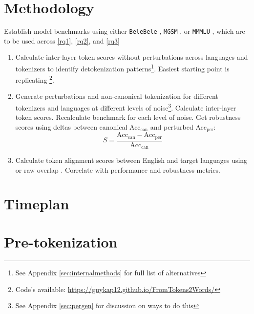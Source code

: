 \documentclass[a4paper]{article}
\begin{document}
\section{Methodology}

Establish model benchmarks using either \texttt{BeleBele} \parencite{bandarkar2024}, \texttt{MGSM} \parencite{shi2022}, or \texttt{MMMLU} \parencite{hendrycks2021}, which are to be used across \ref{rq1}, \ref{rq2}, and \ref{rq3}

\begin{enumerate}[label=\textbf{RQ\arabic*}]

\item Calculate inter-layer token scores without perturbations across languages and tokenizers to identify detokenization patterns\footnote{See Appendix \ref{sec:internalmethods} for full list of alternatives}. Easiest starting point is replicating \textcite{kaplan2025}\footnote{Code's available: \url{https://guykap12.github.io/FromTokens2Words/}}.

\item Generate perturbations and non-canonical tokenization for different tokenizers and languages at different levels of noise\footnote{See Appendix \ref{sec:pergen} for discussion on ways to do this}. Calculate inter-layer token scores. Recalculate benchmark for each level of noise. Get robustness scores using deltas between canonical Acc$_{\text{can}}$ and perturbed Acc$_{\text{per}}$:
\[
S = \frac{\text{Acc}_{\text{can}}  - \text{Acc}_{\text{per}}}{\text{Acc}_{\text{can}}}
\]


\item Calculate token alignment scores between English and target languages using \textcite{hammerl2025} or raw overlap \parencite{kallini2025}. Correlate with performance and robustness metrics.

\end{enumerate}

\section{Timeplan}



\printbibliography

\appendix

\section{Pre-tokenization}\label{sec:pretokenization}
\end{document}
